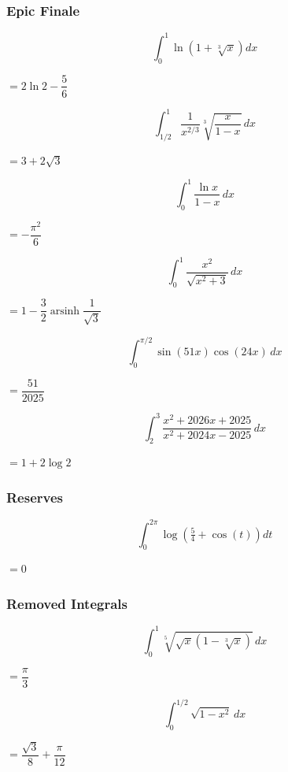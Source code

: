 \subsubsection*{Epic Finale}
\begin{questions}

\question \[ \int_0^1 \ln\left(1+\sqrt[3]{x}\right) dx \]
\begin{solution} $= 2\ln 2 - \dfrac{5}{6}$ \end{solution}

\question \[ \int_{1/2}^1 \frac{1}{x^{2/3}}\sqrt[3]{\frac{x}{1-x}}\, dx \]
\begin{solution} $= 3+2\sqrt3$ \end{solution}

\question \[ \int_0^1 \frac{\ln x}{1-x}\, dx \]
\begin{solution} $= -\dfrac{\pi^2}{6}$ \end{solution}

\question \[ \int_0^1 \frac{x^2}{\sqrt{x^2+3}}\, dx \]
\begin{solution} $= 1-\dfrac{3}{2}\operatorname{arsinh}\dfrac{1}{\sqrt3}$ \end{solution}

\question[Tiebreaker 1] \[ \int_0^{\pi/2} \sin(51x)\cos(24x)\, dx \]
\begin{solution} $= \dfrac{51}{2025}$ \end{solution}

\question[Tiebreaker 2] \[ \int_2^3 \frac{x^2+2026x+2025}{x^2+2024x-2025}\, dx \]
\begin{solution} $= 1+2\log 2$ \end{solution}

\end{questions}

\subsubsection*{Reserves}
\begin{questions}

\question \[ \int_0^{2\pi} \log\left(\tfrac{5}{4}+\cos(t)\right) dt \]
\begin{solution} $= 0$ \end{solution}

\end{questions}

\subsubsection*{Removed Integrals}
\begin{questions}

\question \[ \int_0^1 \sqrt[5]{\sqrt{x}\left(1-\sqrt[3]{x}\right)}\, dx \]
\begin{solution} $= \dfrac{\pi}{3}$ \end{solution}

\question \[ \int_0^{1/2} \sqrt{1-x^2}\, dx \]
\begin{solution} $= \dfrac{\sqrt3}{8}+\dfrac{\pi}{12}$ \end{solution}

\end{questions}

